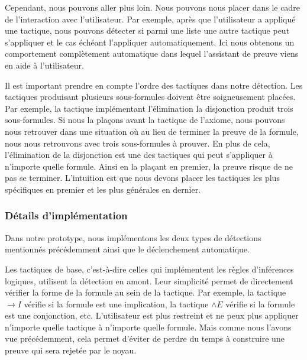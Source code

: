 \documentclass[titlepage]{article}
\begin{document}
Cependant, nous pouvons aller plus loin. Nous pouvons nous placer dans le cadre de l'interaction avec l'utilisateur. Par exemple, après que l'utilisateur a appliqué une tactique, nous pouvons détecter si parmi une liste une autre tactique peut s'appliquer et le cas échéant l'appliquer automatiquement. Ici nous obtenons un comportement complètement automatique dans lequel l'assistant de preuve viens en aide à l'utilisateur.

Il est important prendre en compte l'ordre des tactiques dans notre détection. Les tactiques produisant plusieurs sous-formules doivent être soigneusement placées. Par exemple, la tactique implémentant l'élimination la disjonction produit trois sous-formules. Si nous la plaçons avant la tactique de l'axiome, nous pouvons nous retrouver dans une situation où au lieu de terminer la preuve de la formule, nous nous retrouvons avec trois sous-formules à prouver. En plus de cela, l'élimination de la disjonction est une des tactiques qui peut s'appliquer à n'importe quelle formule. Ainsi en la plaçant en premier, la preuve risque de ne pas se terminer. L'intuition est que nous devons placer les tactiques les plus spécifiques en premier et les plus générales en dernier.

\subsubsection{Détails d'implémentation}
Dans notre prototype, nous implémentons les deux types de détections mentionnés précédemment ainsi que le déclenchement automatique.

Les tactiques de base, c'est-à-dire celles qui implémentent les règles d'inférences logiques, utilisent la détection en amont. Leur simplicité permet de directement vérifier la forme de la formule au sein de la tactique. Par exemple, la tactique $\to I$ vérifie si la formule est une implication, la tactique $\land E$ vérifie si la formule est une conjonction, etc. L'utilisateur est plus restreint et ne peux plus appliquer n'importe quelle tactique à n'importe quelle formule. Mais comme nous l'avons vue précédemment, cela permet d'éviter de perdre du temps à construire une preuve qui sera rejetée par le noyau.
\end{document}
